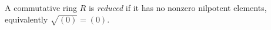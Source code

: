 
A commutative ring $R$ is \emph{reduced} if it has no nonzero nilpotent elements, equivalently $\sqrt{(0)}=(0)$.
